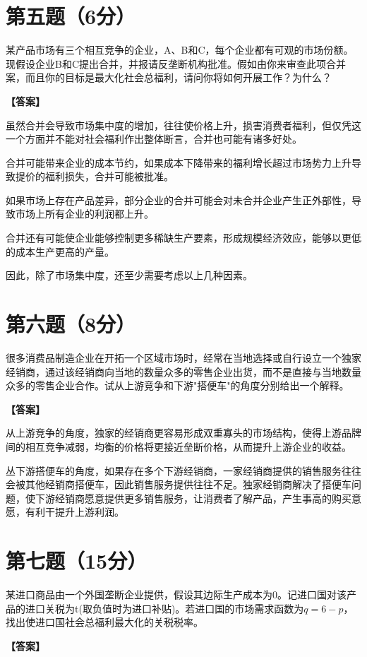 \documentclass[12pt]{article}
\begin{document}
\section*{第五题（6分）}
某产品市场有三个相互竞争的企业，A、B和C，每个企业都有可观的市场份额。现假设企业B和C提出合并，并报请反垄断机构批准。假如由你来审查此项合并案，而且你的目标是最大化社会总福利，请问你将如何开展工作？为什么？

\noindent\textbf{【答案】}

虽然合并会导致市场集中度的增加，往往使价格上升，损害消费者福利，但仅凭这一个方面并不能对社会福利作出整体断言，合并也可能有诸多好处。

合并可能带来企业的成本节约，如果成本下降带来的福利增长超过市场势力上升导致提价的福利损失，合并可能被批准。

如果市场上存在产品差异，部分企业的合并可能会对未合并企业产生正外部性，导致市场上所有企业的利润都上升。

合并还有可能使企业能够控制更多稀缺生产要素，形成规模经济效应，能够以更低的成本生产更高的产量。

因此，除了市场集中度，还至少需要考虑以上几种因素。

\section*{第六题（8分）}
很多消费品制造企业在开拓一个区域市场时，经常在当地选择或自行设立一个独家经销商，通过该经销商向当地的数量众多的零售企业出货，而不是直接与当地数量众多的零售企业合作。试从上游竞争和下游"搭便车"的角度分别给出一个解释。

\noindent\textbf{【答案】}

从上游竞争的角度，独家的经销商更容易形成双重寡头的市场结构，使得上游品牌间的相互竞争减弱，均衡的价格将更接近垒断价格，从而提升上游企业的收益。

丛下游搭便车的角度，如果存在多个下游经销商，一家经销商提供的销售服务往往会被其他经销商搭便车，因此销售服务提供往往不足。独家经销商解决了搭便车问题，使下游经销商愿意提供更多销售服务，让消费者了解产品，产生事高的购买意愿，有利干提升上游利润。

\section*{第七题（15分）}
某进口商品由一个外国垄断企业提供，假设其边际生产成本为0。记进口国对该产品的进口关税为t(取负值时为进口补贴)。若进口国的市场需求函数为$q=6-p$，找出使进口国社会总福利最大化的关税税率。

\noindent\textbf{【答案】}
\end{document}
